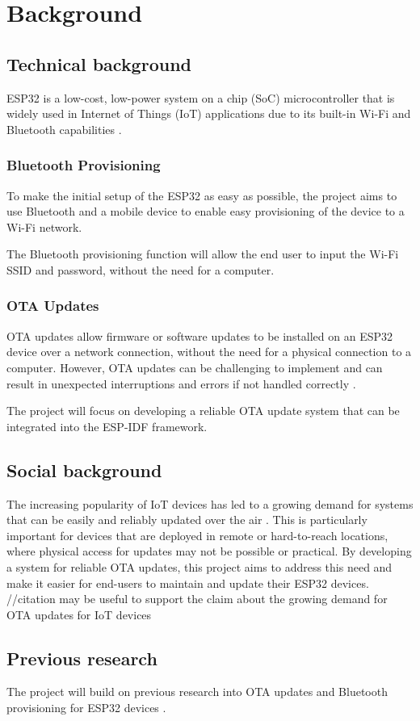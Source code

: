 \section{Background}
\label{sec:background}

\subsection{Technical background}
\label{sec:technical}
ESP32 is a low-cost, low-power system on a chip (SoC) microcontroller that is widely used in Internet of Things (IoT) applications due to its built-in Wi-Fi and Bluetooth capabilities \cite{espressif:popularity} \cite{espressif:esp32_datasheet}.

\subsubsection{Bluetooth Provisioning}
\label{subsec:bluetooth}
To make the initial setup of the ESP32 as easy as possible, the project aims to use Bluetooth and a mobile device to enable easy provisioning of the device to a Wi-Fi network.

The Bluetooth provisioning function will allow the end user to input the Wi-Fi SSID and password, without the need for a computer.

\subsubsection{OTA Updates}
\label{subsec:ota}
OTA updates allow firmware or software updates to be installed on an ESP32 device over a network connection, without the need for a physical connection to a computer. However, OTA updates can be challenging to implement and can result in unexpected interruptions and errors if not handled correctly \cite{Arakadakis:2021}.

The project will focus on developing a reliable OTA update system that can be integrated into the ESP-IDF framework.

\subsection{Social background}
\label{sec:social}
The increasing popularity of IoT devices has led to a growing demand for systems that can be easily and reliably updated over the air \cite{Villegas:2019}. This is particularly important for devices that are deployed in remote or hard-to-reach locations, where physical access for updates may not be possible or practical. By developing a system for reliable OTA updates, this project aims to address this need and make it easier for end-users to maintain and update their ESP32 devices. //citation may be useful to support the claim about the growing demand for OTA updates for IoT devices

\subsection{Previous research}
\label{sec:previous}
The project will build on previous research into OTA updates and Bluetooth provisioning for ESP32 devices \cite{espressif:esp-idf-programming-guide}.